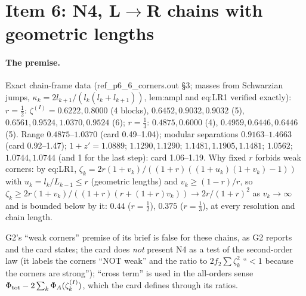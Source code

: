 \documentclass[11pt]{article}
\begin{document}
\section{Item 6: N4, L$\to$R chains with geometric lengths}\label{sec:i6}
\paragraph{The premise.} Exact chain-frame data (ref\_p6\_6\_corners.out \S3; masses from Schwarzian jumps,
$\kappa_k=2l_{k+1}/(l_k(l_k+l_{k+1}))$, lem:ampl and eq:LR1 verified exactly): $r=\frac12$: $\zeta^{(I)}=
0.6222,0.8000$ (4 blocks), $0.6452,0.9032,0.9032$ (5), $0.6561,0.9524,1.0370,0.9524$ (6); $r=\frac13$:
$0.4875,0.6000$ (4), $0.4959,0.6446,0.6446$ (5). Range $0.4875$--$1.0370$ (card 0.49--1.04); modular separations
$0.9163$--$1.4663$ (card 0.92--1.47); $1+z'=1.0889$; $1.1290,1.1290$; $1.1481,1.1905,1.1481$; $1.0562$;
$1.0744,1.0744$ (and 1 for the last step): card 1.06--1.19. Why fixed $r$ forbids weak corners: by eq:LR1,
$\zeta_k=2r(1+v_k)/((1+r)((1+u_k)(1+v_k)-1))$ with $u_k=l_k/L_{k-1}\le r$ (geometric lengths) and
$v_k\ge(1-r)/r$, so $\zeta_k\ge2r(1+v_k)/((1+r)(r+(1+r)v_k))\to2r/(1+r)^2$ as $v_k\to\infty$ and is bounded
below by it: $0.44$ ($r=\frac12$), $0.375$ ($r=\frac13$), at every resolution and chain length.
\begin{verdictok}
G2's ``weak corners'' premise of its brief is false for these chains, as G2 reports and the card states; the card
does \emph{not} present N4 as a test of the second-order law (it labels the corners ``NOT weak'' and the ratio to
$2f_2\sum\zeta_k^2$ ``$<1$ because the corners are strong''); ``cross term'' is used in the all-orders sense
$\Phi_{\rm tot}-2\sum_k\Phi_A(\zeta_k^{(I)})$, which the card defines through its ratios.
\end{verdictok}
\end{document}
